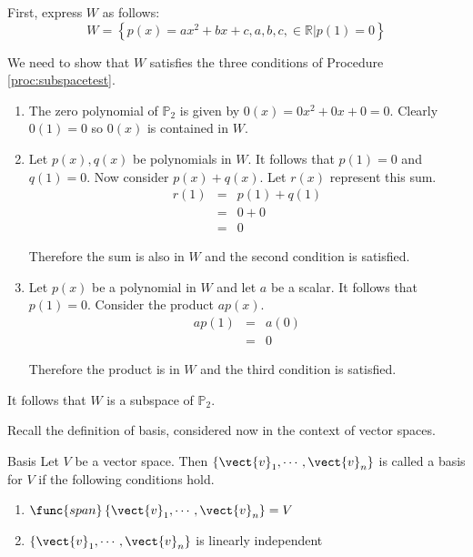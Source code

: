 \begin{solution}
First, express $W$ as follows:
\[
W = \left\{ p(x) = ax^2 +bx +c, a,b,c, \in \mathbb{R} | p(1)  = 0 \right\}
\]

We need to show that $W$ satisfies the three conditions of Procedure \ref{proc:subspacetest}. 
\begin{enumerate}
\item
The zero polynomial of $\mathbb{P}_2$ is given by $0(x) = 0x^2 + 0x + 0 = 0$. Clearly $0(1) = 0$ so $0(x)$ is contained in $W$. 

\item
Let $p(x), q(x)$ be polynomials in $W$.  It follows that $p(1) = 0 $ and $q(1) = 0$. Now consider $p(x) + q(x)$. Let $r(x)$ represent this sum.
\begin{eqnarray*}
r(1) &=& p(1) + q(1) \\
&=& 0 + 0 \\
&=& 0
\end{eqnarray*}

Therefore the sum is also in $W$ and the second condition is satisfied. 

\item
Let $p(x)$ be a polynomial in $W$ and let $a$ be a scalar. It follows that $p(1) = 0$. Consider the product $ap(x)$. 
\begin{eqnarray*}
ap(1) &=& a(0) \\
&=& 0
\end{eqnarray*}

Therefore the product is in $W$ and the third condition is satisfied.
\end{enumerate}

It follows that $W$ is a subspace of $\mathbb{P}_2$. 
\end{solution} 

Recall the definition of basis, considered now in the context of vector spaces.

\begin{definition}{Basis}\label{def:basisvectorspace}
Let $V$ be a vector space. Then $\{\vect{v}_{1},\cdots ,\vect{v}_{n}\}$ is called a basis
 for $V$ if the following conditions hold.
\begin{enumerate}
\item
$\func{span}\left\{ \vect{v}_{1},\cdots ,\vect{v}_{n}\right\} = V$
\item
$\{\vect{v}_{1},\cdots ,\vect{v}_{n}\}$ is linearly independent
\end{enumerate}
\end{definition}

